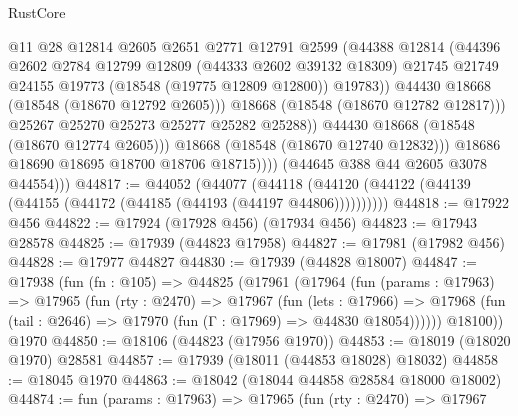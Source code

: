 \begin{lexlean}{RustCore}
\begin{coremodule}
                            @11
                            @28
                            @12814
                            @2605
                            @2651
                            @2771
                            @12791
                            @2599
                            (@44388
                              @12814
                              (@44396
                                @2602
                                @2784
                                @12799
                                @12809
                                (@44333 @2602 @39132 @18309)
                                @21745
                                @21749
                                @24155
                                @19773
                                (@18548 (@19775 @12809 @12800))
                                @19783))
                            @44430
                            @18668
                            (@18548 (@18670 @12792 @2605)))
                          @18668
                          (@18548 (@18670 @12782 @12817)))
                        @25267
                        @25270
                        @25273
                        @25277
                        @25282
                        @25288))
                    @44430
                    @18668
                    (@18548 (@18670 @12774 @2605)))
                  @18668
                  (@18548 (@18670 @12740 @12832)))
                @18686
                @18690
                @18695
                @18700
                @18706
                @18715))))
        (@44645 @388 @44 @2605 @3078 @44554)))
@44817 := @44052
    (@44077 (@44118 (@44120 (@44122 (@44139 (@44155 (@44172 (@44185 (@44193 (@44197 @44806))))))))))
@44818 := @17922 @456
@44822 := @17924 (@17928 @456) (@17934 @456)
@44823 := @17943 @28578
@44825 := @17939 (@44823 @17958)
@44827 := @17981 (@17982 @456)
@44828 := @17977 @44827
@44830 := @17939 (@44828 @18007)
@44847 := @17938
    (fun (fn : @105) =>
    @44825
      (@17961
        (@17964
          (fun (params : @17963) =>
          @17965
            (fun (rty : @2470) =>
            @17967
              (fun (lets : @17966) =>
              @17968 (fun (tail : @2646) => @17970 (fun (Γ : @17969) => @44830 @18054))))))
        @18100))
    @1970
@44850 := @18106 (@44823 (@17956 @1970))
@44853 := @18019 (@18020 @1970) @28581
@44857 := @17939 (@18011 (@44853 @18028) @18032)
@44858 := @18045 @1970
@44863 := @18042 (@18044 @44858 @28584 @18000 @18002)
@44874 := fun (params : @17963) =>
  @17965
    (fun (rty : @2470) =>
    @17967

\end{coremodule}
\end{lexlean}
